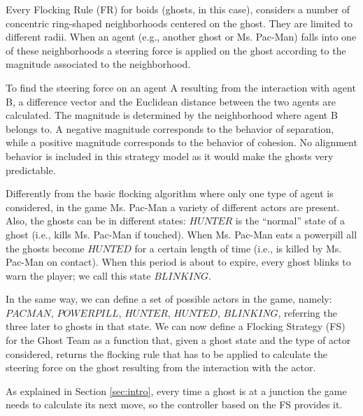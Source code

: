 \documentclass[a4paper]{llncs}
\begin{document}
Every Flocking Rule (FR) for boids (ghosts, in this case), considers a number of concentric ring-shaped neighborhoods centered on the ghost. They are limited to different radii. When an agent (e.g., another ghost or Ms. Pac-Man) falls into one of these neighborhoods a steering force is applied on the ghost according to the magnitude associated to the neighborhood.

To find the steering force on an agent A resulting from the interaction with agent B, a difference vector and the Euclidean distance between the two agents are calculated.
The magnitude is determined by the neighborhood where agent B belongs to.
A negative magnitude corresponds to the behavior of separation, while a positive magnitude corresponds to the behavior of cohesion. No alignment behavior is included in this strategy model as it would make the ghosts very predictable.

Differently from the basic flocking algorithm where only one type of agent is considered, in the game Ms. Pac-Man a variety of different actors are present. Also, the ghosts can be in different states: $HUNTER$ is the ``normal'' state of a ghost (i.e., kills Ms. Pac-Man if touched).  When Ms. Pac-Man eats a powerpill all the ghosts become $HUNTED$ for a certain length of time (i.e., is killed by Ms. Pac-Man on contact). When this period is about to expire, every ghost blinks to warn the player; we call this state $BLINKING$. 

In the same way, we can define a set of possible actors in the game, namely:
$PACMAN$, $POWERPILL$, $HUNTER$, $HUNTED$, $BLINKING$, referring the three later to ghosts in that state. We can now define a Flocking Strategy (FS) for the Ghost Team as a function that, given a ghost state and the type of actor considered, returns the flocking rule that has to be applied to calculate the steering force on the ghost resulting from the interaction with the actor.

As explained in Section \ref{sec:intro}, every time a ghost is at a junction the game needs to calculate its next move, so the controller based on the FS provides it.
\end{document}
